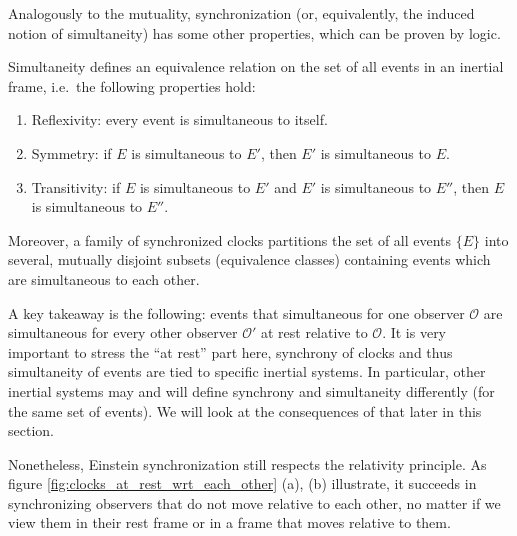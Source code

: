 Analogously to the mutuality, synchronization (or, equivalently, the induced notion of simultaneity) has some other properties, which can be proven by logic.
\begin{prop}\label{prop:simult_equiv_relation}
	Simultaneity defines an equivalence relation on the set of all events in an inertial frame, i.e.~the following properties hold:
	\begin{enumerate}
		\item Reflexivity: every event is simultaneous to itself.
		
		\item Symmetry: if $E$ is simultaneous to $E'$, then $E'$ is simultaneous to $E$.
		
		\item Transitivity: if $E$ is simultaneous to $E'$ and $E'$ is simultaneous to $E''$, then $E$ is simultaneous to $E''$.
	\end{enumerate}
	
	Moreover, a family of synchronized clocks partitions the set of all events $\{E\}$ into several, mutually disjoint subsets (equivalence classes) containing events which are simultaneous to each other.
\end{prop}
A key takeaway is the following: events that simultaneous for one observer $\mathcal{O}$ are simultaneous for every other observer $\mathcal{O}'$ at rest relative to $\mathcal{O}$. It is very important to stress the \enquote{at rest} part here, synchrony of clocks and thus simultaneity of events are tied to specific inertial systems. In particular, other inertial systems may and will define synchrony and simultaneity differently (for the same set of events). We will look at the consequences of that later in this section.

Nonetheless, Einstein synchronization still respects the relativity principle. As figure \ref{fig:clocks_at_rest_wrt_each_other} (a), (b) illustrate, it succeeds in synchronizing observers that do not move relative to each other, no matter if we view them in their rest frame or in a frame that moves relative to them.\\


